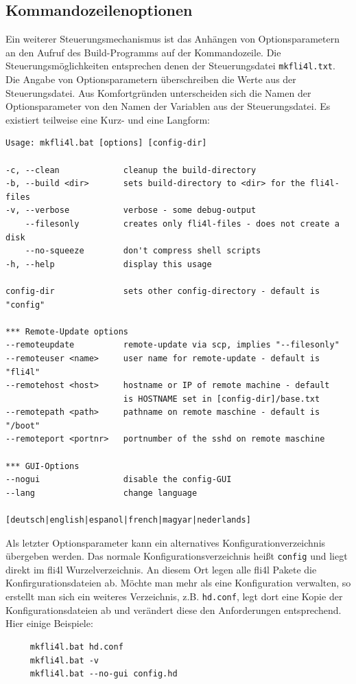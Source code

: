   \subsection{Kommandozeilenoptionen}
  Ein weiterer Steuerungsmechanismus ist das Anhängen von Optionsparametern an
  den Aufruf des Build-Programms auf der Kommandozeile. Die
  Steuerungsmöglichkeiten entsprechen denen der Steuerungsdatei \texttt{mkfli4l.txt}.
  Die Angabe von Optionsparametern überschreiben die Werte aus
  der Steuerungsdatei. Aus Komfortgründen unterscheiden sich die Namen der
  Optionsparameter von den Namen der Variablen aus der Steuerungsdatei. Es
  existiert teilweise eine Kurz- und eine Langform:

  \begin{verbatim}
Usage: mkfli4l.bat [options] [config-dir]

-c, --clean             cleanup the build-directory
-b, --build <dir>       sets build-directory to <dir> for the fli4l-files
-v, --verbose           verbose - some debug-output
    --filesonly         creates only fli4l-files - does not create a disk
    --no-squeeze        don't compress shell scripts
-h, --help              display this usage

config-dir              sets other config-directory - default is "config"

*** Remote-Update options
--remoteupdate          remote-update via scp, implies "--filesonly"
--remoteuser <name>     user name for remote-update - default is "fli4l"
--remotehost <host>     hostname or IP of remote machine - default
                        is HOSTNAME set in [config-dir]/base.txt
--remotepath <path>     pathname on remote maschine - default is "/boot"
--remoteport <portnr>   portnumber of the sshd on remote maschine

*** GUI-Options
--nogui                 disable the config-GUI
--lang                  change language
                        [deutsch|english|espanol|french|magyar|nederlands]

  \end{verbatim}

  Als letzter Optionsparameter  kann ein alternatives Konfigurationverzeichnis
  übergeben werden. Das normale Konfigurationsverzeichnis heißt \texttt{config}
  und liegt direkt im fli4l Wurzelverzeichnis. An diesem Ort legen alle fli4l
  Pakete die Konfirgurationsdateien ab. Möchte man mehr als eine Konfiguration
  verwalten, so erstellt man sich ein weiteres Verzeichnis, z.B. \texttt{hd.conf},
  legt dort eine Kopie der Konfigurationsdateien ab und verändert diese den
  Anforderungen entsprechend. Hier einige Beispiele:
  \begin{verbatim}
     mkfli4l.bat hd.conf
     mkfli4l.bat -v
     mkfli4l.bat --no-gui config.hd
  \end{verbatim}

